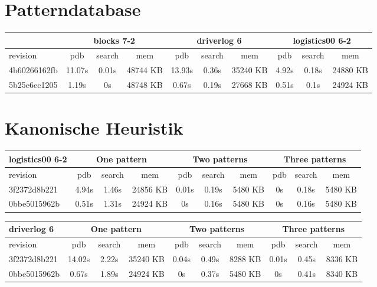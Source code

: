 \documentclass[a4paper,12pt]{scrartcl}
\begin{document}
\section{Patterndatabase}

\begin{tabular}{|l|c|c|c|c|c|c|c|c|c|}\hline
& \multicolumn{3}{c|}{blocks 7-2} & \multicolumn{3}{c|}{driverlog 6} & \multicolumn{3}{c|}{logistics00 6-2}\\\hline
revision & pdb & search & mem & pdb & search & mem & pdb & search & mem\\\hline
4b60266162fb & 11.07s & 0.01s & 48744 KB & 13.93s & 0.36s & 35240 KB & 4.92s & 0.18s & 24880 KB\\\hline
5b25e6ec1205 & 1.19s & 0s & 48748 KB & 0.67s & 0.19s & 27668 KB & 0.51s & 0.1s & 24924 KB\\\hline
\end{tabular}

\section{Kanonische Heuristik}

\begin{tabular}{|l|c|c|c|c|c|c|c|c|c|}\hline
logistics00 6-2 & \multicolumn{3}{c|}{One pattern} & \multicolumn{3}{c|}{Two patterns} & \multicolumn{3}{c|}{Three patterns}\\\hline
revision & pdb & search & mem & pdb & search & mem & pdb & search & mem\\\hline
3f2372d8b221 & 4.94s & 1.46s & 24856 KB & 0.01s & 0.19s & 5480 KB & 0s & 0.18s & 5480 KB\\\hline
0bbe5015962b & 0.51s & 1.31s & 24924 KB & 0s & 0.16s & 5480 KB & 0s & 0.16s & 5480 KB\\\hline
\end{tabular}

\begin{tabular}{|l|c|c|c|c|c|c|c|c|c|}\hline
driverlog 6 & \multicolumn{3}{c|}{One pattern} & \multicolumn{3}{c|}{Two patterns} & \multicolumn{3}{c|}{Three patterns}\\\hline
revision & pdb & search & mem & pdb & search & mem & pdb & search & mem\\\hline
3f2372d8b221 & 14.02s & 2.22s & 35240 KB & 0.04s & 0.49s & 8288 KB & 0.01s & 0.45s & 8336 KB \\\hline
0bbe5015962b & 0.67s & 1.89s & 24924 KB & 0s & 0.37s & 5480 KB & 0s & 0.41s & 8340 KB\\\hline
\end{tabular}
\end{document}

